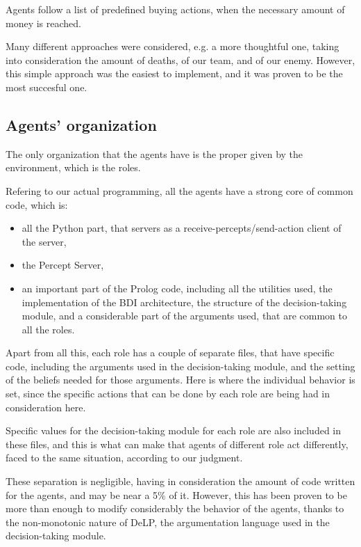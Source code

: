\documentclass{llncs2e/llncs}
\begin{document}
    Agents follow a list of predefined buying actions, when the necessary amount 
    of money is reached.
    
    Many different approaches were considered, e.g. a more thoughtful one, taking
    into consideration the amount of deaths, of our team, and of our enemy.
    However, this simple approach was the easiest to implement, and it was
    proven to be the most succesful one.

\subsection{Agents' organization}

    The only organization that the agents have is the proper given by the 
    environment, which is the roles. 
    
    Refering to our actual programming, all the agents have a strong core of common
    code, which is:
    
    \begin{itemize}
        \item all the Python part, that servers as a receive-percepts/send-action client 
        of the server,
        
        \item the Percept Server,
        
        \item an important part of the Prolog code, including all the utilities used, the
        implementation of the BDI architecture, the structure of the 
        decision-taking module, and a considerable part of the arguments used, that
        are common to all the roles.
    \end{itemize}
    
    Apart from all this, each role has a couple of separate files, that have 
    specific code, including the arguments used in the decision-taking module, and
    the setting of the beliefs needed for those arguments. Here is where the 
    individual behavior is set, since the specific actions that can be done by each
    role are being had in consideration here.
    
    Specific values for the decision-taking module for each role are also included
    in these files, and this is what can make that agents of different role act 
    differently, faced to the same situation, according to our judgment.
    
    These separation is negligible, having in consideration the amount of code 
    written for the agents, and may be near a 5\% of it. However, this has been proven to
    be more than enough to modify considerably the behavior of the agents, thanks to
    the non-monotonic nature of DeLP, the argumentation language used in the 
    decision-taking module.
\end{document}
